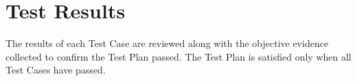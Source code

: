 \section{Test Results}
The results of each Test Case are reviewed along with the objective evidence
collected to confirm the Test Plan passed.  The Test Plan is satisfied only when
all Test Cases have passed.
